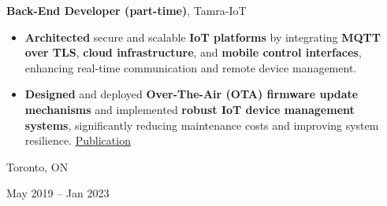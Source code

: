 \documentclass[10pt, letterpaper]{article}
\newenvironment{highlights}{
    \begin{itemize}[
        topsep=0.10 cm,
        parsep=0.10 cm,
        partopsep=0pt,
        itemsep=0pt,
        leftmargin=0.4 cm + 10pt
    ]
}{
    \end{itemize}
} %
\newenvironment{twocolentry}[2][]{
    \onecolentry
    \def\secondColumn{#2}
    \begin{minipage}[t]{\dimexpr\linewidth-4.7cm\relax}
}{
    \end{minipage}\hfill%
    \begin{minipage}[t]{4.5cm}
        \raggedleft\secondColumn
    \end{minipage}
    \endonecolentry
} %
\let\hrefWithoutArrow\href
\renewcommand{\href}[2]{\hrefWithoutArrow{#1}{#2}}
\begin{document}

     \vspace{0.1 cm}
\begin{twocolentry}{
            Toronto, ON

        May 2019 – Jan 2023
        }
            \textbf{Back-End Developer (part-time)}, Tamra-IoT
      \begin{highlights}
    \item \textbf{Architected} secure and scalable \textbf{IoT platforms} by integrating \textbf{MQTT over TLS}, \textbf{cloud infrastructure}, and \textbf{mobile control interfaces}, enhancing real-time communication and remote device management.

    \item \textbf{Designed} and deployed \textbf{Over-The-Air (OTA) firmware update mechanisms} and implemented \textbf{robust IoT device management systems}, significantly reducing maintenance costs and improving system resilience. \href{https://ieeexplore.ieee.org/abstract/document/9824989}{Publication}
\end{highlights}

        \end{twocolentry}
\end{document}

